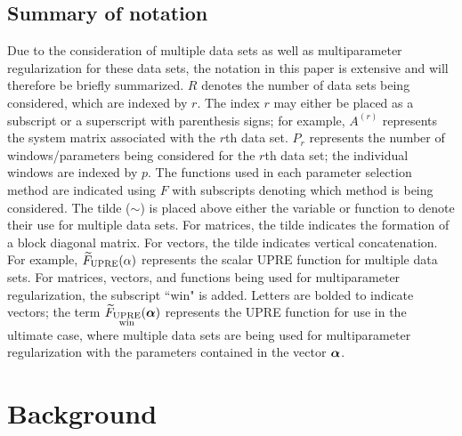\documentclass[12pt]{article}
\begin{document}
\subsection{Summary of notation} \label{sec:Notation}
Due to the consideration of multiple data sets as well as multiparameter regularization for these data sets, the notation in this paper is extensive and will therefore be briefly summarized. $R$ denotes the number of data sets being considered, which are indexed by $r$. The index $r$ may either be placed as a subscript or a superscript with parenthesis signs; for example, $A^{(r)}$ represents the system matrix associated with the $r$th data set. $P_r$ represents the number of windows/parameters being considered for the $r$th data set; the individual windows are indexed by $p$. The functions used in each parameter selection method are indicated using $F$ with subscripts denoting which method is being considered. The tilde ($\sim$) is placed above either the variable or function to denote their use for multiple data sets. For matrices, the tilde indicates the formation of a block diagonal matrix. For vectors, the tilde indicates vertical concatenation. For example, $\widetilde{F}_{\text{UPRE}}(\alpha)$ represents the scalar UPRE function for multiple data sets. For matrices, vectors, and functions being used for multiparameter regularization, the subscript ``win" is added. Letters are bolded to indicate vectors; the term $\widetilde{F}_{\substack{\text{UPRE} \\ \text{win}}}(\bm{\alpha})$ represents the UPRE function for use in the ultimate case, where multiple data sets are being used for multiparameter regularization with the parameters contained in the vector $\bm{\alpha}$.

\section{Background} \label{sec:Background}
\end{document}
